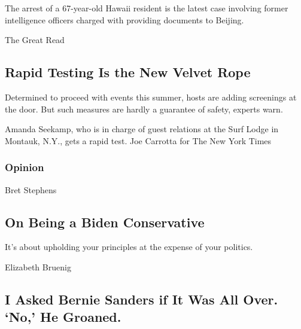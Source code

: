 The arrest of a 67-year-old Hawaii resident is the latest case involving
former intelligence officers charged with providing documents to
Beijing.

\href{/2020/08/16/style/does-rapid-covid-testing-work-weddings-parties.html}{}

The Great Read

\hypertarget{rapid-testing-is-the-new-velvet-rope}{%
\subsection{Rapid Testing Is the New Velvet
Rope}\label{rapid-testing-is-the-new-velvet-rope}}

Determined to proceed with events this summer, hosts are adding
screenings at the door. But such measures are hardly a guarantee of
safety, experts warn.

\href{/2020/08/16/style/does-rapid-covid-testing-work-weddings-parties.html}{}

Amanda Seekamp, who is in charge of guest relations at the Surf Lodge in
Montauk, N.Y., gets a rapid test. Joe Carrotta for The New York Times

\href{https://www.nytimes3xbfgragh.onion/section/opinion?pagetype=Homepage\&action=click\&module=Opinion}{}

\hypertarget{opinion}{%
\subsubsection{Opinion}\label{opinion}}

\href{/2020/08/17/opinion/joe-biden-conservative-2020.html}{}

Bret Stephens

\hypertarget{on-being-a-biden-conservative}{%
\subsection{On Being a Biden
Conservative}\label{on-being-a-biden-conservative}}

It's about upholding your principles at the expense of your politics.

\href{/2020/08/17/opinion/bernie-sanders-joe-biden.html}{}

Elizabeth Bruenig

\hypertarget{i-asked-bernie-sanders-if-it-was-all-over-no-he-groaned}{%
\subsection{I Asked Bernie Sanders if It Was All Over. `No,' He
Groaned.}\label{i-asked-bernie-sanders-if-it-was-all-over-no-he-groaned}}

